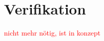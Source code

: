 \section{Verifikation} \label{sec:Verifikation}
    \textcolor{red}{
        nicht mehr nötig, ist in konzept
    }

